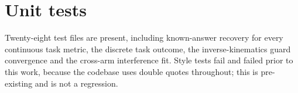 \section{Unit tests}

Twenty-eight test files are present, including known-answer recovery for every
continuous task metric, the discrete task outcome, the inverse-kinematics
guard convergence and the cross-arm interference fit. Style tests fail and
failed prior to this work, because the codebase uses double quotes throughout;
this is pre-existing and is not a regression.
